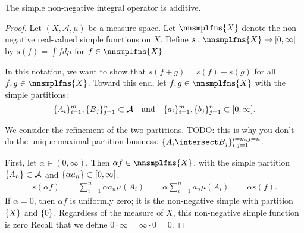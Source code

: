 \begin{prop}

The simple non-negative
integral operator
is additive.

\begin{proof}

Let $(X, \mathcal{A}, \mu)$
be a measure space.
Let $\nnsmplfns{X}$ denote the
non-negative real-valued
simple functions on $X$.
Define
$s: \nnsmplfns{X} \to [0, \infty]$
by
$s(f) = \int f d\mu$
for
$f \in \nnsmplfns{X}$.

In this notation, we want to show
that
$s(f+g) = s(f) + s(g)$
for all
$f, g \in \nnsmplfns{X}$.
Toward this end, let $f,g \in \nnsmplfns{X}$
with the simple partitions:
\[
\{A_i\}_{i = 1}^{m},\{B_j\}_{j = 1}^{n} \subset \mathcal{A}
  \quad \text{and} \quad
\{a_i\}_{i = 1}^{m},\{b_j\}_{j = 1}^{n} \subset [0, \infty].
\]

We consider the refinement
of the two partitions.
TODO: this is why
you don't do the unique maximal
partition business.
$\set{A_i \intersect B_j}_{i, j = 1}^{i = m, j = n}$.


%

First, let
$\alpha \in (0, \infty)$.
Then $\alpha f \in \nnsmplfns{X}$,
with the simple partition
$\{A_n\} \subset \mathcal{A}$
and $\{\alpha a_n\} \subset [0, \infty]$.
\[
  \begin{aligned}
  s(\alpha f) &= \sum_{i = 1}^{n} \alpha a_n \mu(A_i)
              &= \alpha \sum_{i = 1}^{n} a_n \mu(A_i)
              &= \alpha s(f).
  \end{aligned}
\]
If $\alpha = 0$, then $\alpha f$ is uniformly
zero; it is the non-negative simple
with partition $\{X\}$ and $\{0\}$.
Regardless of the measure of $X$,
this non-negative simple function is zero
Recall that we define
$0 \cdot \infty = \infty \cdot 0 = 0$.
\end{proof}

\end{prop}
\strats
